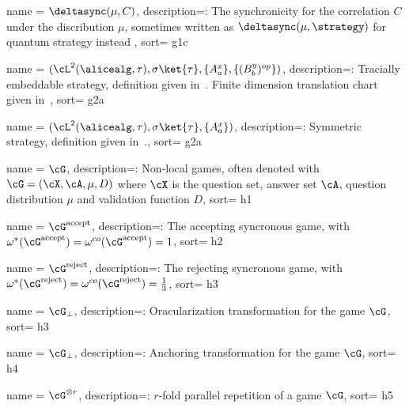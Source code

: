 {
	name = {$\deltasync(\mu, C)$},
	description={: \quad The synchronicity for the correlation $C$ under the discribution $\mu$, sometimes written as $\deltasync(\mu, \strategy)$ for quantum strategy instead }, 
	sort= {g1c}
}

{
	name = {$(\cL^2(\alicealg, \tau),\sigma \ket{\tau}, \{A_a^x \}, \{(B_b^y)^{op}\})$},
	description={: \quad Tracially embeddable strategy, definition given in~. Finite dimension translation chart given in~}, 
	sort= {g2a}
}

{
	name = {$(\cL^2(\alicealg, \tau), \sigma \ket{\tau},\{ A_{a}^x \})$},
	description={: \quad Symmetric strategy, definition given in~.}, 
	sort= {g2a}
}



{
	name = {$\cG$},
	description={: \quad Non-local games, often denoted with $\cG =(\cX, \cA, \mu, D)$ where $\cX$ is the question set, answer set $\cA$, question distribution $\mu$ and validation function $D$}, 
	sort= {h1}
}

{
	name = {$\cG^{\text{accept}}$},
	description={: \quad The accepting syncronous game, with $\omega^{*}(\cG^{\text{accept}}) = \omega^{co}(\cG^{\text{accept}}) =1$}, 
	sort= {h2}
}

{
	name = {$\cG^{\text{reject}}$},
	description={: \quad The rejecting syncronous game, with $\omega^{*}(\cG^{\text{reject}}) = \omega^{co}(\cG^{\text{reject}}) =\frac{1}{3}$}, 
	sort= {h3}
}

{
	name = {$\cG_{\bot}$},
	description={: \quad Oracularization transformation for the game $\cG$}, 
	sort= {h3}
}


{
	name = {$\cG_{\bot}$},
	description={: \quad Anchoring transformation for the game $\cG$}, 
	sort= {h4}
}


{
	name = {$\cG^{\otimes r}$},
	description={: \quad $r$-fold parallel repetition of a game $\cG$}, 
	sort= {h5}
}


